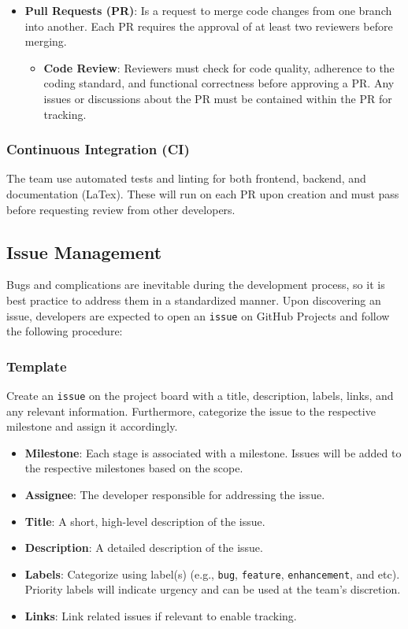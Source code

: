 \documentclass{article}
\begin{document}
\begin{itemize}
    \item \textbf{Pull Requests (PR)}:  Is a request to merge code changes from one branch into another. Each PR requires the approval of at least two reviewers before merging.
    \begin{itemize}
        \item \textbf{Code Review}: Reviewers must check for code quality, adherence to the coding standard, and functional correctness before approving a PR. Any issues or discussions about the PR must be contained within the PR for tracking.
    \end{itemize}
\end{itemize}

\subsubsection{Continuous Integration (CI)}

The team use automated tests and linting for both frontend, backend, and documentation (LaTex). These will run on each PR upon creation and must pass before requesting review from other developers.

\subsection{Issue Management}

Bugs and complications are inevitable during the development process, so it is best practice to address them in a standardized manner. Upon discovering an issue, developers are expected to open an \texttt{issue} on GitHub Projects and follow the following procedure:

\subsubsection{Template}

Create an \texttt{issue} on the project board with a title, description, labels, links, and any relevant information. Furthermore, categorize the issue to the respective milestone and assign it accordingly.

\begin{itemize}
    \item \textbf{Milestone}: Each stage is associated with a milestone. Issues will be added to the respective milestones based on the scope.
    \item \textbf{Assignee}: The developer responsible for addressing the issue.
    \item \textbf{Title}: A short, high-level description of the issue.
    \item \textbf{Description}: A detailed description of the issue.
    \item \textbf{Labels}: Categorize using label(s) (e.g., \texttt{bug}, \texttt{feature}, \texttt{enhancement}, and etc). Priority labels will indicate urgency and can be used at the team’s discretion.
    \item \textbf{Links}: Link related issues if relevant to enable tracking.
\end{itemize}
\end{document}
